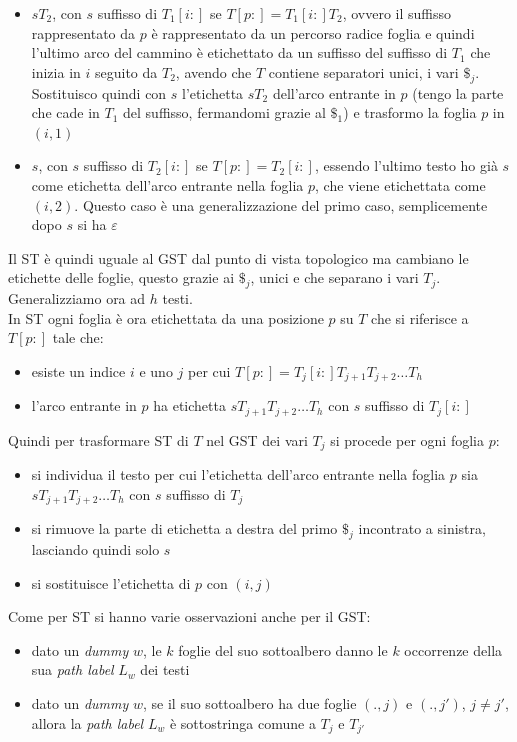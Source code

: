 \documentclass[a4paper,12pt, oneside]{book}
\begin{document}
\begin{itemize}
  \item $sT_2$, con $s$ suffisso di $T_1[i:]$ se $T[p:]=T_1[i:]T_2$, ovvero il
  suffisso rappresentato da $p$ è rappresentato da un percorso radice foglia e
  quindi l'ultimo arco del cammino è etichettato da un suffisso del suffisso di
  $T_1$ che inizia in $i$ seguito da $T_2$, avendo che $T$ contiene separatori
  unici, i vari $\$_j$. Sostituisco quindi con $s$ l'etichetta $sT_2$ dell'arco
  entrante in $p$ (tengo la parte che cade in $T_1$ del suffisso, fermandomi
  grazie al $\$_1$) e trasformo la
  foglia $p$ in $(i,1)$
  \item $s$, con $s$ suffisso di $T_2[i:]$ se $T[p:]=T_2[i:]$, essendo l'ultimo
  testo ho già $s$ come etichetta dell'arco entrante nella foglia $p$, che viene
  etichettata come $(i,2)$. Questo caso è una generalizzazione del primo caso,
  semplicemente dopo $s$ si ha $\varepsilon$
\end{itemize}
Il ST è quindi uguale al GST dal punto di vista topologico ma cambiano le
etichette delle foglie, questo grazie ai $\$_j$, unici e che separano i vari
$T_j$.\\
Generalizziamo ora ad $h$ testi.\\
In ST ogni foglia è ora etichettata da una posizione $p$ su $T$ che si riferisce
a $T[p:]$ tale che:
\begin{itemize}
  \item esiste un indice $i$ e uno $j$ per cui
  $T[p:]=T_j[i:]T_{j+1}T_{j+2}\ldots T_h$
  \item l'arco entrante in $p$ ha etichetta $sT_{j+1}T_{j+2}\ldots T_h$ con $s$
  suffisso di $T_j[i:]$
\end{itemize}
Quindi per trasformare ST di $T$ nel GST dei vari $T_j$ si procede per ogni
foglia $p$:
\begin{itemize}
  \item si individua il testo per cui l'etichetta dell'arco entrante nella
  foglia $p$ sia $sT_{j+1}T_{j+2}\ldots T_h$ con $s$ suffisso di $T_j$
  \item si rimuove la parte di etichetta a destra del primo $\$_j$ incontrato a
  sinistra, lasciando quindi solo $s$
  \item si sostituisce l'etichetta di $p$ con $(i,j)$
\end{itemize}
Come per ST si hanno varie osservazioni anche per il GST:
\begin{itemize}
  \item dato un \textit{dummy} $w$, le $k$ foglie del suo sottoalbero danno le
  $k$ occorrenze della sua \textit{path label} $L_w$ dei testi
  \item dato un \textit{dummy} $w$, se il suo sottoalbero ha due foglie $(.,j)$
  e $(.,j')$, $j\neq j'$, allora la \textit{path label} $L_w$ è sottostringa
  comune a $T_j$ e $T_{j'}$
\end{itemize}
\end{document}
